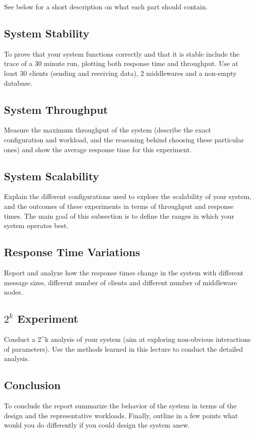 \documentclass[11pt]{article}
\begin{document}
See below for a short description on what each part should contain.

\subsection{System Stability}\label{sec:system-stability}

To prove that your system functions correctly and that it is stable
include the trace of a 30 minute run, plotting both response time and
throughput. Use at least 30 clients (sending and receiving data), 2
middlewares and a non-empty database.

\subsection{System Throughput}\label{sec:system-throughput}

Measure the maximum throughput of the system (describe the exact
configuration and workload, and the reasoning behind choosing these
particular ones) and show the average response time for this experiment.

\subsection{System Scalability}\label{sec:system-scalability}

Explain the different configurations used to explore the scalability of
your system, and the outcomes of these experiments in terms of
throughput and response times. The main goal of this subsection is to
define the ranges in which your system operates best.

\subsection{Response Time Variations}\label{sec:response-time-variations}

Report and analyze how the response times change in the system with
different message sizes, different number of clients and different
number of middleware nodes.

\subsection{$2^k$ Experiment}\label{sec:k-experiment}

Conduct a 2\^{}k analysis of your system (aim at exploring non-obvious
interactions of parameters). Use the methods learned in this lecture to
conduct the detailed analysis.

\subsection{Conclusion}\label{sec:conclusion}

To conclude the report summarize the behavior of the system in terms of
the design and the representative workloads. Finally, outline in a few
points what would you do differently if you could design the system
anew.
\end{document}
